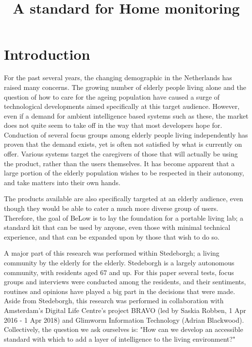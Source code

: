 \documentclass{below-ext}
\title{A standard for Home monitoring}
\author{
  \vspace{-1.5em} 
  \alignauthor{
  	\textbf{Patrick Hendriks}\\
  	\email{patrick.hendriks@hva.nl}
  }
  \vfil
  \alignauthor{
  	\textbf{Mats Otten}\\
  	\email{mats.otten@hva.nl}
  }
  \vfil
  \alignauthor{
  	\textbf{Suzanne Peerdeman}\\
  	\email{suzanne.peerdeman@hva.nl}
  }
  \vfil
  \alignauthor{
  	\textbf{Hogeschool van Amsterdam}\\
  	\affaddr{Wibautstraat 2-4}\\
  	\affaddr{1091 GM, Amsterdam}\\
  }
  \vfil
  \alignauthor{
  	\textbf{Glimworm IT BV}\\
  	\affaddr{Kattenburgerstraat 5}\\
  	\affaddr{1018 JA Amsterdam}\\
  }
}
\begin{document}
\maketitle

\begin{abstract}
\end{abstract}

\section{Introduction}
For the past several years, the changing demographic in the Netherlands has raised many concerns. The growing number of elderly people living alone and the question of how to care for the ageing population have caused a surge of technological developments aimed specifically at this target audience. However, even if a demand for ambient intelligence based systems such as these, the market does not quite seem to take off in the way that most developers hope for. Conduction of several focus groups among elderly people living independently has proven that the demand exists, yet is often not satisfied by what is currently on offer. Various systems target the caregivers of those that will actually be using the product, rather than the users themselves. It has become apparent that a large portion of the elderly population wishes to be respected in their autonomy, and take matters into their own hands.

The products available are also specifically targeted at an elderly audience, even though they would be able to cater a much more diverse group of users. Therefore, the goal of BeLow is to lay the foundation for a portable living lab; a standard kit that can be used by anyone, even those with minimal technical experience, and that can be expanded upon by those that wish to do so.

A major part of this research was performed within Stedeborgh; a living community by the elderly for the elderly. Stedeborgh is a largely autonomous community, with residents aged 67 and up. For this paper several tests, focus groups and interviews were conducted among the residents, and their sentiments, routines and opinions have played a big part in the decisions that were made. Aside from Stedeborgh, this research was performed in collaboration with Amsterdam's Digital Life Centre's project BRAVO (led by Saskia Robben, 1 Apr 2016 - 1 Apr 2018) and Glimworm Information Technology (Adrian Blackwood). Collectively, the question we ask ourselves is: "How can we develop an accessible standard with which to add a layer of intelligence to the living environment?" 
\end{document}
